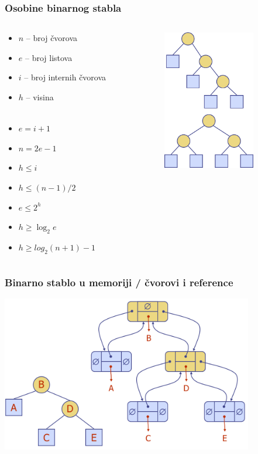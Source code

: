 \documentclass[compress,aspectratio=169]{beamer}
\begin{document}
\begin{frame}[fragile]
  \frametitle{Osobine binarnog stabla}
\begin{columns}
  \begin{column}[c]{6cm}
  \begin{itemize}
    \item $n$ -- broj čvorova
    \item $e$ -- broj listova
    \item $i$ -- broj internih čvorova
    \item $h$ -- visina \\ \ \\
    \item $e = i+1$
    \item $n = 2e-1$
    \item $h\leq i$
    \item $h\leq (n-1)/2$
    \item $e\leq 2^h$
    \item $h\geq \log_2 e$
    \item $h\geq log_2(n+1)-1$
  \end{itemize}
  \end{column}
  \begin{column}[c]{5cm}
  \begin{center}
    \includegraphics[width=4cm]{asp-08-pic09.png}
  \end{center}
  \end{column}
\end{columns}
\end{frame}

\begin{frame}[fragile]
  \frametitle{Binarno stablo u memoriji / čvorovi i reference}
\begin{center}
  \includegraphics[width=11cm]{asp-08-pic13.png}
\end{center}
\end{frame}
\end{document}
